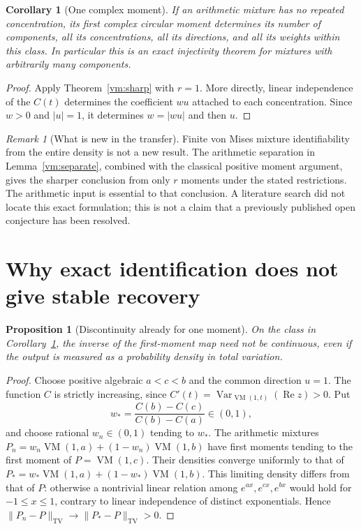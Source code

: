 \documentclass[11pt]{article}
\newtheorem{corollary}[theorem]{Corollary}
\newtheorem{proposition}[theorem]{Proposition}
\theoremstyle{definition}
\theoremstyle{remark}
\newtheorem{remark}[theorem]{Remark}
\newcommand{\VM}{\operatorname{VM}}
\begin{document}
\begin{corollary}[One complex moment]\label{vm:first}
If an arithmetic mixture has no repeated concentration, its first
complex circular moment determines its number of components, all its
concentrations, all its directions, and all its weights within this
class.  In particular this is an exact injectivity theorem for mixtures
with arbitrarily many components.
\end{corollary}
\begin{proof}
Apply Theorem~\ref{vm:sharp} with $r=1$.  More directly, linear
independence of the $C(t)$ determines the coefficient $wu$ attached
to each concentration.  Since $w>0$ and $|u|=1$, it determines
$w=|wu|$ and then $u$.
\end{proof}

\begin{remark}[What is new in the transfer]
Finite von Mises mixture identifiability from the entire density is
not a new result.  The arithmetic separation in
Lemma~\ref{vm:separate}, combined with the classical positive moment
argument, gives the sharper conclusion from only $r$ moments under the
stated restrictions.  The arithmetic input is essential to that
conclusion.  A literature search did not locate this exact formulation;
this is not a claim that a previously published open conjecture has
been resolved.
\end{remark}

\section{Why exact identification does not give stable recovery}

\begin{proposition}[Discontinuity already for one moment]
\label{vm:unstable}
On the class in Corollary~\ref{vm:first}, the inverse of the first-moment
map need not be continuous, even if the output is measured as a
probability density in total variation.
\end{proposition}
\begin{proof}
Choose positive algebraic $a<c<b$ and the common direction $u=1$.
The function $C$ is strictly increasing, since
$C'(t)=\operatorname{Var}_{\VM(1,t)}(\operatorname{Re}z)>0$.
Put
\[
 w_* = \frac{C(b)-C(c)}{C(b)-C(a)}\in(0,1),
\]
and choose rational $w_n\in(0,1)$ tending to $w_*$.  The arithmetic
mixtures
$P_n=w_n\VM(1,a)+(1-w_n)\VM(1,b)$ have first moments tending to
the first moment of $P=\VM(1,c)$.
Their densities converge uniformly to that of
$P_*=w_*\VM(1,a)+(1-w_*)\VM(1,b)$.
This limiting density differs from that of $P$: otherwise a nontrivial
linear relation among $e^{ax},e^{cx},e^{bx}$ would hold for
$-1\leq x\leq1$, contrary to linear independence of distinct
exponentials.  Hence
$\|P_n-P\|_{\mathrm{TV}}\to\|P_*-P\|_{\mathrm{TV}}>0$.
\end{proof}
\end{document}
